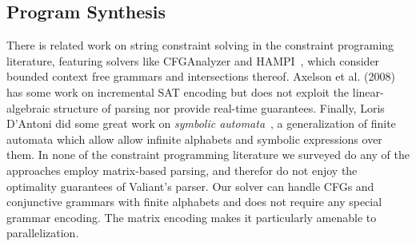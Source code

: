 \documentclass[sigplan,review,anonymous,acmsmall]{acmart}\settopmatter{printfolios=false,printccs=false,printacmref=false}
\begin{document}
%

\subsection{Program Synthesis}

There is related work on string constraint solving in the constraint programing literature, featuring solvers like CFGAnalyzer and HAMPI~\cite{kiezun2009hampi}, which consider bounded context free grammars and intersections thereof. Axelson et al. (2008)~\cite{axelsson2008analyzing} has some work on incremental SAT encoding but does not exploit the linear-algebraic structure of parsing nor provide real-time guarantees. Finally, Loris D'Antoni did some great work on \textit{symbolic automata}~\cite{dantoni2014minimization}, a generalization of finite automata which allow allow infinite alphabets and symbolic expressions over them. In none of the constraint programming literature we surveyed do any of the approaches employ matrix-based parsing, and therefor do not enjoy the optimality guarantees of Valiant's parser. Our solver can handle CFGs and conjunctive grammars with finite alphabets and does not require any special grammar encoding. The matrix encoding makes it particularly amenable to parallelization.
\end{document}
